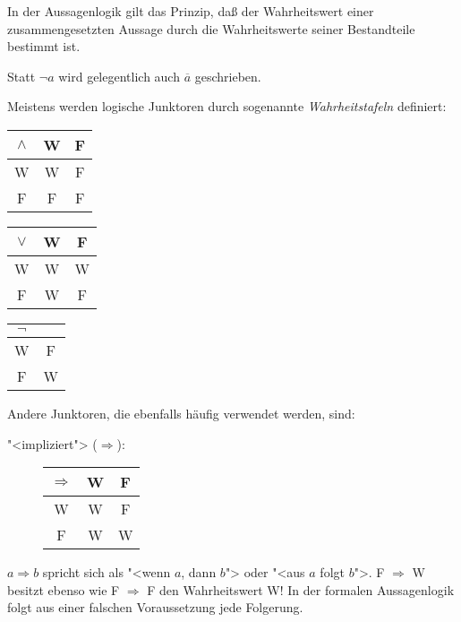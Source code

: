 In der Aussagenlogik gilt %
das Prinzip, daß der Wahr\-heits\-wert 
einer
zusammengesetzten Aussage durch die Wahrheitswerte seiner Bestandteile
bestimmt ist.

Statt $\neg a$ wird gelegentlich auch $\overline{a}$ geschrieben.

Meistens werden logische Junktoren durch sogenannte \emph{Wahrheitstafeln}
 definiert:
%
\begin{center}
\begin{tabular}{c||c|c}
$\wedge$   &  W   &  F \\ \hline \hline
    W      &  W   &  F \\ \hline
    F      &  F   &  F
\end{tabular}
\hspace{3em}
\begin{tabular}{c||c|c}
$\vee$     &  W   &  F \\ \hline \hline
    W      &  W   &  W \\ \hline
    F      &  W   &  F 
\end{tabular}
\hspace{3em}
\begin{tabular}{c||c}
$\neg$     \\ \hline \hline
    W      &  F \\ \hline
    F      &  W
\end{tabular}
\end{center}
%
Andere Junktoren, die ebenfalls häufig verwendet werden, sind:
\begin{description}
\item["<impliziert"> ($ \Rightarrow $):]
%
\hspace{2em}\begin{tabular}{c||c|c}
$ \Rightarrow $     &  W   &  F \\ \hline \hline
    W      &  W   &  F \\ \hline
    F      &  W   &  W 
\end{tabular}
\end{description}

$a \Rightarrow b$ spricht sich als "<wenn $a$, dann $b$"> oder "<aus $a$
folgt $b$">.  F $\Rightarrow$ W besitzt ebenso wie F $\Rightarrow$ F
den Wahrheitswert W! In der formalen Aussagenlogik folgt
aus einer falschen Voraussetzung jede Folgerung.  %

